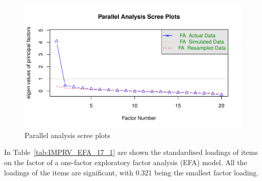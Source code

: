 \documentclass[a4paper]{report}
\begin{document}
\begin{figure}[H]
  \centering
  \includegraphics[width=\linewidth]{fig/IMPRV_EFA_scree.pdf}
  \caption{\label{fig:IMPRV_EFA_scree}Parallel analysis scree plots}
\end{figure}

In Table~\ref{tab:IMPRV_EFA_17_1} are shown the standardised loadings of items on the factor of a one-factor exploratory factor analysis (EFA) model. All the loadings of the items are significant, with 0.321 being the smallest factor loading. 
\end{document}
